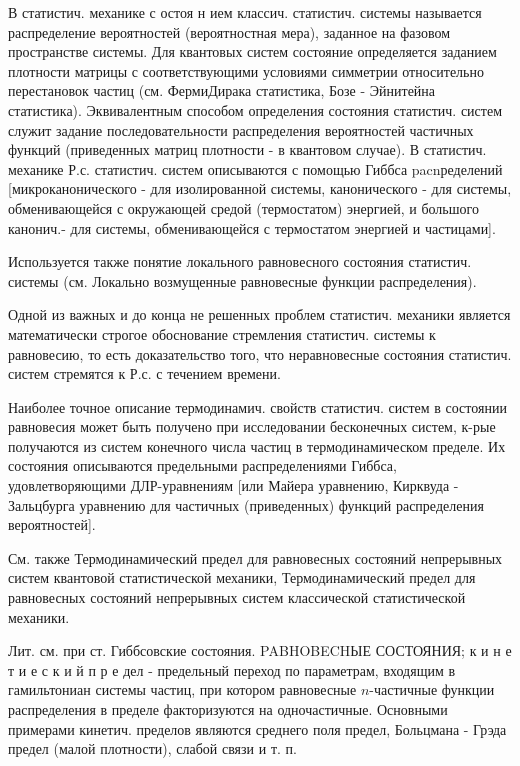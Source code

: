 \documentclass[10pt]{article}
\begin{document}
В статистич. механике с остоя н ием классич. статистич. системы называется распределение вероятностей (вероятностная мера), заданное на фазовом пространстве системы. Для квантовых систем состояние определяется заданием плотности матрицы с соответствующими условиями симметрии относительно перестановок частиц (см. ФермиДирака статистика, Бозе - Эйнитейна статистика). Эквивалентным способом определения состояния статистич. систем служит задание последовательности распределения вероятностей частичных функций (приведенных матриц плотности - в квантовом случае). В статистич. механике Р.с. статистич. систем описываются с помощью Гиббса pacnределений [микроканонического - для изолированной системы, канонического - для системы, обменивающейся с окружающей средой (термостатом) энергией, и большого канонич.- для системы, обменивающейся с термостатом энергией и частицами].



Используется также понятие локального равновесного состояния статистич. системы (см. Локально возмущенные равновесные функции распределения).



Одной из важных и до конца не решенных проблем статистич. механики является математически строгое обоснование стремления статистич. системы к равновесию, то есть доказательство того, что неравновесные состояния статистич. систем стремятся к Р.с. с течением времени.



Наиболее точное описание термодинамич. свойств статистич. систем в состоянии равновесия может быть получено при исследовании бесконечных систем, к-рые получаются из систем конечного числа частиц в термодинамическом пределе. Их состояния описываются предельными распределениями Гиббса, удовлетворяющими ДЛР-уравнениям [или Майера уравнению, Кирквуда - Зальцбурга уравнению для частичных (приведенных) функций распределения вероятностей].



См. также Термодинамический предел для равновесных состояний непрерывных систем квантовой статистической механики, Термодинамический предел для равновесных состояний непрерывных систем классической статистической механики.



Лит. см. при ст. Гиббсовские состояния. PABHOBECHЫЕ СОСТОЯНИЯ; к и н е т и е с к и й п р е дел - предельный переход по параметрам, входящим в гамильтониан системы частиц, при котором равновесные $n$-частичные функции распределения в пределе факторизуются на одночастичные. Основными примерами кинетич. пределов являются среднего поля предел, Больцмана - Грэда предел (малой плотности), слабой связи и т. п.
\end{document}
